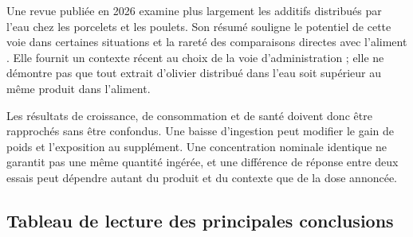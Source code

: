 Une revue publiée en 2026 examine plus largement les additifs distribués par l'eau chez les porcelets et les poulets. Son résumé souligne le potentiel de cette voie dans certaines situations et la rareté des comparaisons directes avec l'aliment \citep{Correa2026}. Elle fournit un contexte récent au choix de la voie d'administration ; elle ne démontre pas que tout extrait d'olivier distribué dans l'eau soit supérieur au même produit dans l'aliment.

Les résultats de croissance, de consommation et de santé doivent donc être rapprochés sans être confondus. Une baisse d'ingestion peut modifier le gain de poids et l'exposition au supplément. Une concentration nominale identique ne garantit pas une même quantité ingérée, et une différence de réponse entre deux essais peut dépendre autant du produit et du contexte que de la dose annoncée.

\clearpage
\subsection{Tableau de lecture des principales conclusions}

